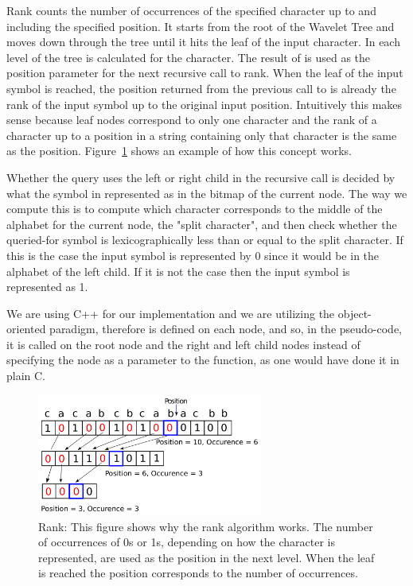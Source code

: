 Rank counts the number of occurrences of the specified character up to and including the specified position. 
It starts from the root of the Wavelet Tree and moves down through the tree until it hits the leaf of the input character.
In each level of the tree  is calculated for the character. 
The result of  is used as the position parameter for the next recursive call to rank.
When the leaf of the input symbol is reached, the position returned from the previous call to  is already the rank of the input symbol up to the original input position.
Intuitively this makes sense because leaf nodes correspond to only one character and the rank of a character up to a position in a string containing only that character is the same as the position.
Figure~\ref{fig:RankDrawing} shows an example of how this concept works.

Whether the query uses the left or right child in the recursive call is decided by what the symbol in represented as in the bitmap of the current node.
The way we compute this is to compute which character corresponds to the middle of the alphabet for the current node, the "split character", and then check whether the queried-for symbol is lexicographically less than or equal to the split character. 
If this is the case the input symbol is represented by 0 since it would be in the alphabet of the left child.
If it is not the case then the input symbol is represented as 1.

We are using C++ for our implementation and we are utilizing the object-oriented paradigm, therefore  is defined on each node, and so, in the pseudo-code, it is called on the root node and the right and left child nodes instead of specifying the node as a parameter to the  function, as one would have done it in plain C.

\begin{figure}
\center \includegraphics[width=0.66\textwidth]{RankDrawing}
\caption{Rank: This figure shows why the rank algorithm works. The number of occurrences of 0s or 1s, depending on how the character is represented, are used as the position in the next level. 
When the leaf is reached the position corresponds to the number of occurrences.}
\label{fig:RankDrawing}
\end{figure}

